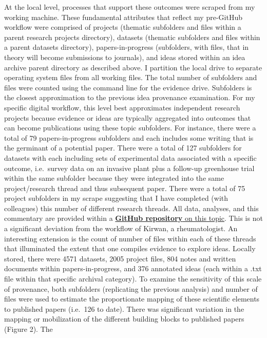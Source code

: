 \documentclass[]{elsarticle} %
\begin{document}
At the local level, processes that support these outcomes were scraped
from my working machine. These fundamental attributes that reflect my
pre-GitHub workflow were comprised of projects (thematic subfolders and
files within a parent research projects directory), datasets (thematic
subfolders and files within a parent datasets directory),
papers-in-progress (subfolders, with files, that in theory will become
submissions to journals), and ideas stored within an idea archive parent
directory as described above. I partition the local drive to separate
operating system files from all working files. The total number of
subfolders and files were counted using the command line for the
evidence drive. Subfolders is the closest approximation to the previous
idea provenance examination. For my specific digital workflow, this
level best approximates independent research projects because evidence
or ideas are typically aggregated into outcomes that can become
publications using these topic subfolders. For instance, there were a
total of 79 papers-in-progress subfolders and each includes some writing
that is the germinant of a potential paper. There were a total of 127
subfolders for datasets with each including sets of experimental data
associated with a specific outcome, i.e.~survey data on an invasive
plant plus a follow-up greenhouse trial within the same subfolder
because they were integrated into the same project/research thread and
thus subsequent paper. There were a total of 75 project subfolders in my
scrape suggesting that I have completed (with colleagues) this number of
different research threads. All data, analyses, and this commentary are
provided within a
\href{https://cjlortie.github.io/bad.ideas/}{\textbf{GitHub repository}
on this topic}. This is not a significant deviation from the workflow of
Kirwan, a rheumatologist. An interesting extension is the count of
number of files within each of these threads that illuminated the extent
that one compiles evidence to explore ideas. Locally stored, there were
4571 datasets, 2005 project files, 804 notes and written documents
within papers-in-progress, and 376 annotated ideas (each within a .txt
file within that specific archival category). To examine the sensitivity
of this scale of provenance, both subfolders (replicating the previous
analysis) and number of files were used to estimate the proportionate
mapping of these scientific elements to published papers (i.e.~126 to
date). There was significant variation in the mapping or mobilization of
the different building blocks to published papers (Figure 2). The
\end{document}
